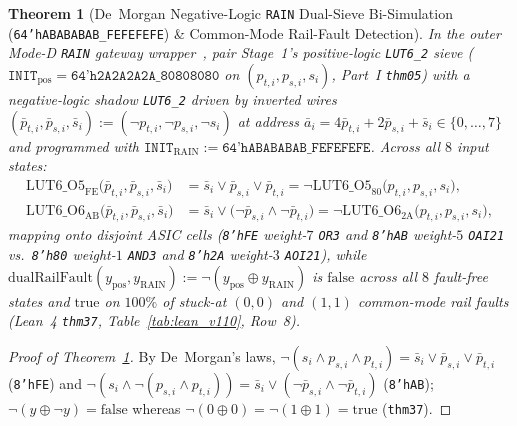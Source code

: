 \documentclass[10pt,twocolumn]{article}
\theoremstyle{spectralthm}
\newtheorem{theorem}{Theorem}[section]
\begin{document}
\begin{theorem}[De~Morgan Negative-Logic \texttt{RAIN} Dual-Sieve Bi-Simulation (\texttt{64'hABABABAB\_FEFEFEFE}) \& Common-Mode Rail-Fault Detection]
\label{thm:rain_demorgan_duality}
In the outer Mode-D \texttt{RAIN} gateway wrapper~\cite{ncdsmo2020rain,mitra2000commonmode}, pair Stage~1's positive-logic \mbox{\texttt{LUT6\_2}} sieve ($\texttt{INIT}_{\mathrm{pos}} = \texttt{64'h2A2A2A2A\_80808080}$ on $(p_{t,i}, p_{s,i}, s_i)$, Part~I \texttt{thm05}) with a negative-logic shadow \mbox{\texttt{LUT6\_2}} driven by inverted wires $(\bar{p}_{t,i}, \bar{p}_{s,i}, \bar{s}_i) := (\neg p_{t,i}, \neg p_{s,i}, \neg s_i)$ at address $\bar{a}_i = 4\bar{p}_{t,i} + 2\bar{p}_{s,i} + \bar{s}_i \in \{0,\ldots,7\}$ and programmed with $\texttt{INIT}_{\mathrm{RAIN}} := \texttt{64'hABABABAB\_FEFEFEFE}$. Across all $8$ input states:
\begin{equation}
\label{eq:rain_dual}
\begin{aligned}
\mathrm{LUT6\_O5}_{\mathrm{FE}}\bigl(\bar{p}_{t,i}, \bar{p}_{s,i}, \bar{s}_i\bigr)
  &= \bar{s}_i \vee \bar{p}_{s,i} \vee \bar{p}_{t,i} = \neg \mathrm{LUT6\_O5}_{80}\bigl(p_{t,i}, p_{s,i}, s_i\bigr),\\
\mathrm{LUT6\_O6}_{\mathrm{AB}}\bigl(\bar{p}_{t,i}, \bar{p}_{s,i}, \bar{s}_i\bigr)
  &= \bar{s}_i \vee \bigl(\neg\bar{p}_{s,i} \wedge \neg\bar{p}_{t,i}\bigr) = \neg \mathrm{LUT6\_O6}_{2\mathrm{A}}\bigl(p_{t,i}, p_{s,i}, s_i\bigr),
\end{aligned}
\end{equation}
mapping onto disjoint ASIC cells (\texttt{8'hFE} weight-$7$ \texttt{OR3} and \texttt{8'hAB} weight-$5$ \texttt{OAI21} vs.\ \texttt{8'h80} weight-$1$ \texttt{AND3} and \texttt{8'h2A} weight-$3$ \texttt{AOI21}), while $\mathrm{dualRailFault}(y_{\mathrm{pos}}, y_{\mathrm{RAIN}}) := \neg(y_{\mathrm{pos}} \oplus y_{\mathrm{RAIN}})$ is $\mathrm{false}$ across all $8$ fault-free states and $\mathrm{true}$ on $100\%$ of stuck-at $(0,0)$ and $(1,1)$ common-mode rail faults (Lean~4 \texttt{thm37}, Table~\ref{tab:lean_v110}, Row~8).
\end{theorem}
\begin{proof}[Proof of Theorem~\ref{thm:rain_demorgan_duality}]
By De~Morgan's laws, $\neg(s_i \wedge p_{s,i} \wedge p_{t,i}) = \bar{s}_i \vee \bar{p}_{s,i} \vee \bar{p}_{t,i}$ (\texttt{8'hFE}) and $\neg(s_i \wedge \neg(p_{s,i} \wedge p_{t,i})) = \bar{s}_i \vee (\neg\bar{p}_{s,i} \wedge \neg\bar{p}_{t,i})$ (\texttt{8'hAB}); $\neg(y \oplus \neg y) = \mathrm{false}$ whereas $\neg(0 \oplus 0) = \neg(1 \oplus 1) = \mathrm{true}$ (\texttt{thm37}).
\end{proof}
\end{document}

